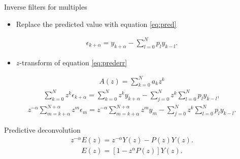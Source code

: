 \documentclass[xcolor=dvipsnames,notes]{beamer}
\begin{document}
%
\begin{frame}{Inverse filters for multiples}
\sf
\begin{itemize}
 \item Replace the predicted value with equation \eqref{eq:pred}
\end{itemize}
%
\begin{eqnarray}
  \epsilon_{k+\alpha}=y_{k+\alpha} -\sum^N_{l=0}p_l y_{k-l}. 
                               \label{eq:prederr2}
\end{eqnarray}
\begin{itemize}
\item $z$-transform of equation \eqref{eq:prederr}
\end{itemize}
\begin{eqnarray}
A(z) = \sum_{k=0}^N a_k z^k
\end{eqnarray}
%
\begin{eqnarray}
  \sum^N_{k=0}z^{k}\epsilon_{k+\alpha}
       =\sum^N_{k=0}z^{k}y_{k+\alpha} -\sum^N_{j=0}z^{k}\sum^N_{l=0}p_l y_{k-l}, 
                               \label{eq:prederr3}
\end{eqnarray}
%
\begin{eqnarray}
  z^{-\alpha}\sum^{N+\alpha}_{m=k+\alpha}z^{m}\epsilon_{m}
       =z^{-\alpha}\sum^{N+\alpha}_{m=k+\alpha}z^{m}y_{m} -\sum^N_{j=0}z^{k}\sum^N_{l=0}p_l y_{k-l}. 
                               \label{eq:prederr4}
\end{eqnarray}
\end{frame}
\begin{frame}{Predictive deconvolution}
%
\begin{eqnarray}
  z^{-\alpha}E(z)
       =z^{-\alpha}Y(z) -P(z)Y(z).
                               \label{eq:prederr5}
\end{eqnarray}
%
\begin{eqnarray}
  E(z)=[1 -z^{\alpha}P(z)]Y(z).
                               \label{eq:prederr6}
\end{eqnarray}
%
\end{frame}
%
\end{document}
